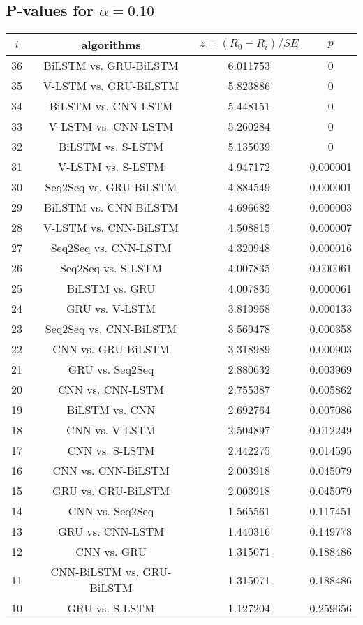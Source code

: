 \documentclass[a4paper,10pt]{article}
\begin{document}
\begin{landscape}
\subsection{P-values for $\alpha=0.10$}

\begin{table}[!htp]
\centering\scriptsize
\begin{tabular}{cccc}
$i$&algorithms&$z=(R_0 - R_i)/SE$&$p$\\
\hline36&BiLSTM vs. GRU-BiLSTM&6.011753&0\\
35&V-LSTM vs. GRU-BiLSTM&5.823886&0\\
34&BiLSTM vs. CNN-LSTM&5.448151&0\\
33&V-LSTM vs. CNN-LSTM&5.260284&0\\
32&BiLSTM vs. S-LSTM&5.135039&0\\
31&V-LSTM vs. S-LSTM&4.947172&0.000001\\
30&Seq2Seq vs. GRU-BiLSTM&4.884549&0.000001\\
29&BiLSTM vs. CNN-BiLSTM&4.696682&0.000003\\
28&V-LSTM vs. CNN-BiLSTM&4.508815&0.000007\\
27&Seq2Seq vs. CNN-LSTM&4.320948&0.000016\\
26&Seq2Seq vs. S-LSTM&4.007835&0.000061\\
25&BiLSTM vs. GRU&4.007835&0.000061\\
24&GRU vs. V-LSTM&3.819968&0.000133\\
23&Seq2Seq vs. CNN-BiLSTM&3.569478&0.000358\\
22&CNN vs. GRU-BiLSTM&3.318989&0.000903\\
21&GRU vs. Seq2Seq&2.880632&0.003969\\
20&CNN vs. CNN-LSTM&2.755387&0.005862\\
19&BiLSTM vs. CNN&2.692764&0.007086\\
18&CNN vs. V-LSTM&2.504897&0.012249\\
17&CNN vs. S-LSTM&2.442275&0.014595\\
16&CNN vs. CNN-BiLSTM&2.003918&0.045079\\
15&GRU vs. GRU-BiLSTM&2.003918&0.045079\\
14&CNN vs. Seq2Seq&1.565561&0.117451\\
13&GRU vs. CNN-LSTM&1.440316&0.149778\\
12&CNN vs. GRU&1.315071&0.188486\\
11&CNN-BiLSTM vs. GRU-BiLSTM&1.315071&0.188486\\
10&GRU vs. S-LSTM&1.127204&0.259656\\

\end{tabular}
\end{table}
\end{landscape}
\end{document}
